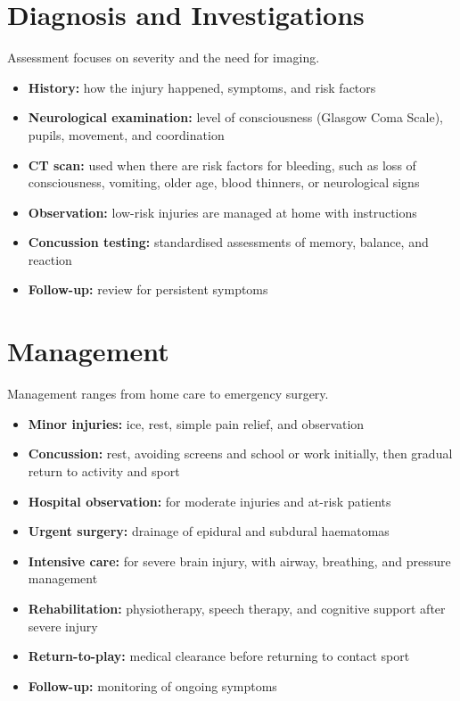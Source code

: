 \section*{Diagnosis and Investigations}
Assessment focuses on severity and the need for imaging.

\begin{itemize}
    \item \textbf{History:} how the injury happened, symptoms, and risk factors
    \item \textbf{Neurological examination:} level of consciousness (Glasgow Coma Scale), pupils, movement, and coordination
    \item \textbf{CT scan:} used when there are risk factors for bleeding, such as loss of consciousness, vomiting, older age, blood thinners, or neurological signs
    \item \textbf{Observation:} low-risk injuries are managed at home with instructions
    \item \textbf{Concussion testing:} standardised assessments of memory, balance, and reaction
    \item \textbf{Follow-up:} review for persistent symptoms
\end{itemize}

\section*{Management}
Management ranges from home care to emergency surgery.

\begin{itemize}
    \item \textbf{Minor injuries:} ice, rest, simple pain relief, and observation
    \item \textbf{Concussion:} rest, avoiding screens and school or work initially, then gradual return to activity and sport
    \item \textbf{Hospital observation:} for moderate injuries and at-risk patients
    \item \textbf{Urgent surgery:} drainage of epidural and subdural haematomas
    \item \textbf{Intensive care:} for severe brain injury, with airway, breathing, and pressure management
    \item \textbf{Rehabilitation:} physiotherapy, speech therapy, and cognitive support after severe injury
    \item \textbf{Return-to-play:} medical clearance before returning to contact sport
    \item \textbf{Follow-up:} monitoring of ongoing symptoms
\end{itemize}

